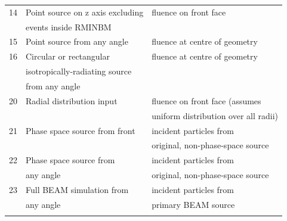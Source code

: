 \documentclass[12pt,twoside]{article}  %
\begin{document}
\begin{latexonly}
\begin{longtable}{lll}
14 & Point source on z axis excluding & fluence on front face\\
   & events inside RMINBM                 & \\
\hline
15 & Point source from any angle & fluence at centre of geometry\\
\hline
16 & Circular or rectangular & fluence at centre of geometry\\
   & isotropically-radiating source & \\
   & from any angle  &\\
\hline
20 & Radial distribution input & fluence on front face (assumes\\
   &                           & uniform distribution over all radii)\\
\hline
21 & Phase space source from front & incident particles from\\
   &                               & original, non-phase-space source\\
\hline
22 & Phase space source from   & incident particles from\\
   & any angle  & original, non-phase-space source\\
\hline
23 & Full BEAM simulation from   & incident particles from\\
   & any angle  & primary BEAM source\\
\label{normtable}
\end{longtable}
\end{latexonly}
\end{document}
